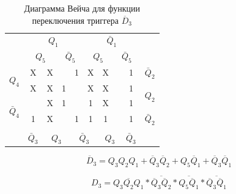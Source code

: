 \documentclass[a4paper,14pt]{article}
\begin{document}
\begin{table}[H]
	\begin{center}
		\caption{\label{tab:unD3_tab} Диаграмма Вейча для функции переключения триггера $\overline{D}_3$ }
		\begin{tabular}{cccccccccc}
			& \multicolumn{4}{c}{$Q_1$} & \multicolumn{4}{c}{$\bar{Q}_1$} &  \\
			& \multicolumn{2}{c}{$Q_5$} & \multicolumn{2}{c}{$\bar{Q}_5$} & \multicolumn{2}{c}{$Q_5$} & \multicolumn{2}{c}{$\bar{Q}_5$} &  \\ \cline{2-9}
			\multicolumn{1}{c|}{\multirow{2}{*}{$Q_4$}} & \multicolumn{1}{c|}{X} & \multicolumn{1}{c|}{X} & \multicolumn{1}{c|}{} & \multicolumn{1}{c|}{1} & \multicolumn{1}{c|}{X} & \multicolumn{1}{c|}{X} & \multicolumn{1}{c|}{} & \multicolumn{1}{c|}{1} & $\bar{Q}_2$ \\ \cline{2-9}
			\multicolumn{1}{c|}{} & \multicolumn{1}{c|}{X} & \multicolumn{1}{c|}{X} & \multicolumn{1}{c|}{1} & \multicolumn{1}{c|}{} & \multicolumn{1}{c|}{X} & \multicolumn{1}{c|}{X} & \multicolumn{1}{c|}{} & \multicolumn{1}{c|}{1} & \multirow{2}{*}{$Q_2$} \\ \cline{2-9}
			\multicolumn{1}{c|}{\multirow{2}{*}{$\bar{Q}_4$}} & \multicolumn{1}{c|}{} & \multicolumn{1}{c|}{X} & \multicolumn{1}{c|}{1} & \multicolumn{1}{c|}{} & \multicolumn{1}{c|}{1} & \multicolumn{1}{c|}{X} & \multicolumn{1}{c|}{} & \multicolumn{1}{c|}{1} &  \\ \cline{2-9}
			\multicolumn{1}{c|}{} & \multicolumn{1}{c|}{1} & \multicolumn{1}{c|}{X} & \multicolumn{1}{c|}{} & \multicolumn{1}{c|}{1} & \multicolumn{1}{c|}{1} & \multicolumn{1}{c|}{1} & \multicolumn{1}{c|}{} & \multicolumn{1}{c|}{1} & $\bar{Q}_2$ \\ \cline{2-9}
			&  & \multicolumn{2}{c}{} & \multicolumn{2}{c}{} & \multicolumn{2}{c}{} &  &  \\
			& $\bar{Q}_3$ & \multicolumn{2}{c}{$Q_3$} & \multicolumn{2}{c}{$\bar{Q}_3$} & \multicolumn{2}{c}{$Q_3$} & $\bar{Q}_3$ & 
		\end{tabular}
	\end{center}
\end{table}

$$\overline{D}_3 = Q_3Q_2Q_1 + \overline{Q}_3\overline{Q}_2 + Q_5\overline{Q}_1 + \overline{Q}_3\overline{Q}_1$$

$$D_3 = \overline{Q_3Q_2Q_1} *\overline{\overline{Q}_3\overline{Q}_2} * \overline{Q_5\overline{Q}_1} * \overline{\overline{Q}_3\overline{Q}_1}$$


\end{document}
